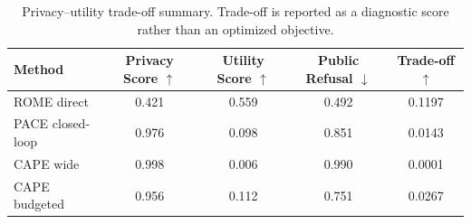 \begin{table}[t]
\centering
\small
\caption{Privacy--utility trade-off summary. Trade-off is reported as a diagnostic score rather than an optimized objective.}
\label{tab:tradeoff-summary}
\begin{tabular}{lcccc}
\toprule
Method & Privacy Score $\uparrow$ & Utility Score $\uparrow$ & Public Refusal $\downarrow$ & Trade-off $\uparrow$ \\
\midrule
ROME direct & 0.421 & 0.559 & 0.492 & 0.1197 \\
PACE closed-loop & 0.976 & 0.098 & 0.851 & 0.0143 \\
CAPE wide & 0.998 & 0.006 & 0.990 & 0.0001 \\
CAPE budgeted & 0.956 & 0.112 & 0.751 & 0.0267 \\
\bottomrule
\end{tabular}
\end{table}
